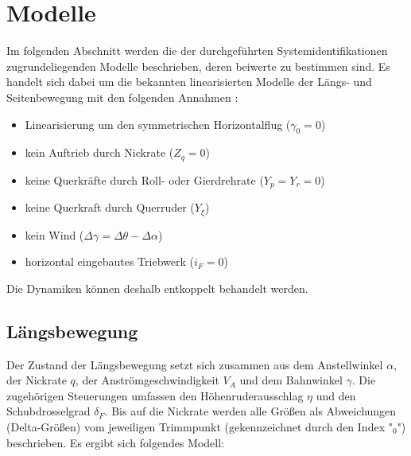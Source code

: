 \chapter{Modelle}

Im folgenden Abschnitt werden die der durchgeführten Systemidentifikationen 
zugrundeliegenden Modelle beschrieben, deren beiwerte zu bestimmen sind. Es 
handelt sich dabei um die bekannten linearisierten Modelle der Längs- und 
Seitenbewegung mit den folgenden Annahmen \cite{Fichter2009}:
\begin{itemize}
	\item Linearisierung um den symmetrischen Horizontalflug ($ \gamma_0=0 $)
	\item kein Auftrieb durch Nickrate ($ Z_q=0 $)
	\item keine Querkräfte durch Roll- oder Gierdrehrate ($ Y_p=Y_r=0 $)
	\item keine Querkraft durch Querruder ($ Y_\xi $)
	\item kein Wind ($ \Delta\gamma = \Delta\theta-\Delta\alpha $)
	\item horizontal eingebautes Triebwerk ($ i_F=0 $)
\end{itemize} 
Die Dynamiken können deshalb entkoppelt behandelt werden. %

\section{Längsbewegung}
Der Zustand der Längsbewegung setzt sich zusammen aus dem Anstellwinkel $ 
\alpha $, der Nickrate $ q $, der Anströmgeschwindigkeit $ V_A $ und dem 
Bahnwinkel $ \gamma $. Die zugehörigen Steuerungen umfassen den 
Höhenruderausschlag $ \eta $ und den Schubdrosselgrad $ \delta_F $. Bis auf die 
Nickrate werden alle Größen als Abweichungen (Delta-Größen) vom jeweiligen 
Trimmpunkt 
(gekennzeichnet durch den Index "$ _0 $") beschrieben. Es ergibt sich folgendes 
Modell\cite{Fichter2009}:

